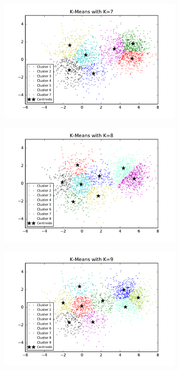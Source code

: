 \begin{description}
\begin{description}
\begin{figure}[!h]
\begin{subfigure}[b]{0.475\textwidth}
            \includegraphics[width=\textwidth]{./figures/clustering_kMeans_7.pdf}
        \end{subfigure}
        \hfill
        \begin{subfigure}[b]{0.475\textwidth}  
            \centering 
            \includegraphics[width=\textwidth]{./figures/clustering_kMeans_8.pdf}
        \end{subfigure}
        \begin{subfigure}[b]{0.475\textwidth}   
            \centering 
            \includegraphics[width=\textwidth]{./figures/clustering_kMeans_9.pdf}

\end{subfigure}
\end{figure}
\end{description}
\end{description}

